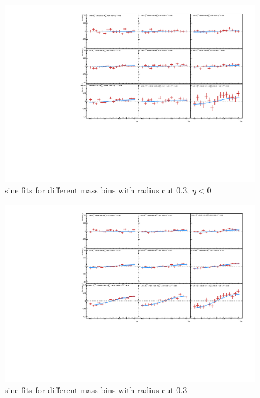 \documentclass[letterpaper, abstract = on,listof=totoc, bibliography=totoc]{scrreprt}
\begin{document}
\begin{appendices}
\begin{figure}
\begin{center}
\includegraphics[width = 1\textwidth]{cone3Vm_loEtaV2.pdf}
\caption[sine fits for different mass bins with radius cut 0.3]{sine fits for different mass bins with radius cut 0.3, $\eta < 0$}
\label{}
\end{center}
\end{figure}

\begin{figure}
\begin{center}
\includegraphics[width = 1\textwidth]{cone3Vm_fullEtaV2.pdf}
\caption[sine fits for different mass bins with radius cut 0.3]{sine fits for different mass bins with radius cut 0.3}
\label{}
\end{center}
\end{figure}



\end{appendices}
\end{document}
